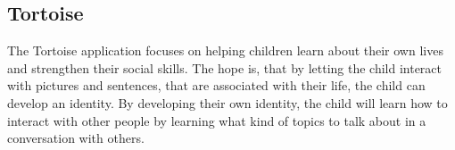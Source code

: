 \subsection{Tortoise}
\label{sub:tortoise}
The Tortoise application focuses on helping children learn about their own lives and strengthen their social skills. The hope is, that by letting the child interact with pictures and sentences, that are associated with their life, the child can develop an identity. By developing their own identity, the child will learn how to interact with other people by learning what kind of topics to talk about in a conversation with others.